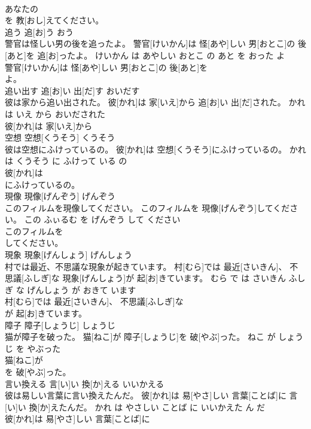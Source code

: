 \documentclass[8pt]{extreport}
\begin{document}
\begin{CJK}{UTF8}{min}
\\	あなたの
\\	を 教[おし]えてください。			
\\	追う	追[お]う	おう	
\\	警官は怪しい男の後を追ったよ。	警官[けいかん]は 怪[あや]しい 男[おとこ]の 後[あと]を 追[お]ったよ。	けいかん は あやしい おとこ の あと を おった よ	
\\	警官[けいかん]は 怪[あや]しい 男[おとこ]の 後[あと]を
\\	よ。			
\\	追い出す	追[お]い 出[だ]す	おいだす	
\\	彼は家から追い出された。	彼[かれ]は 家[いえ]から 追[お]い 出[だ]された。	かれ は いえ から おいだされた	
\\	彼[かれ]は 家[いえ]から
\\	空想	空想[くうそう]	くうそう	
\\	彼は空想にふけっているの。	彼[かれ]は 空想[くうそう]にふけっているの。	かれ は くうそう に ふけって いる の	
\\	彼[かれ]は
\\	にふけっているの。			
\\	現像	現像[げんぞう]	げんぞう	
\\	このフィルムを現像してください。	このフィルムを 現像[げんぞう]してください。	この ふぃるむ を げんぞう して ください	
\\	このフィルムを
\\	してください。			
\\	現象	現象[げんしょう]	げんしょう	
\\	村では最近、不思議な現象が起きています。	村[むら]では 最近[さいきん]、 不思議[ふしぎ]な 現象[げんしょう]が 起[お]きています。	むら で は さいきん ふしぎ な げんしょう が おきて います	
\\	村[むら]では 最近[さいきん]、 不思議[ふしぎ]な
\\	が 起[お]きています。			
\\	障子	障子[しょうじ]	しょうじ	
\\	猫が障子を破った。	猫[ねこ]が 障子[しょうじ]を 破[やぶ]った。	ねこ が しょうじ を やぶった	
\\	猫[ねこ]が
\\	を 破[やぶ]った。			
\\	言い換える	言[い]い 換[か]える	いいかえる	
\\	彼は易しい言葉に言い換えたんだ。	彼[かれ]は 易[やさ]しい 言葉[ことば]に 言[い]い 換[か]えたんだ。	かれ は やさしい ことば に いいかえた ん だ	
\\	彼[かれ]は 易[やさ]しい 言葉[ことば]に

\end{CJK}
\end{document}

